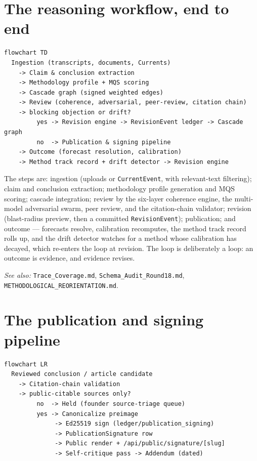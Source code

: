 \documentclass[11pt]{article}
\begin{document}
\section{The reasoning workflow, end to end}

\begin{Verbatim}[frame=single,fontsize=\small]
flowchart TD
  Ingestion (transcripts, documents, Currents)
    -> Claim & conclusion extraction
    -> Methodology profile + MQS scoring
    -> Cascade graph (signed weighted edges)
    -> Review (coherence, adversarial, peer-review, citation chain)
    -> blocking objection or drift?
         yes -> Revision engine -> RevisionEvent ledger -> Cascade graph
         no  -> Publication & signing pipeline
    -> Outcome (forecast resolution, calibration)
    -> Method track record + drift detector -> Revision engine
\end{Verbatim}

The steps are: ingestion (uploads or \texttt{CurrentEvent}, with relevant-text
filtering); claim and conclusion extraction; methodology profile generation
and MQS scoring; cascade integration; review by the six-layer coherence
engine, the multi-model adversarial swarm, peer review, and the citation-chain
validator; revision (blast-radius preview, then a committed
\texttt{RevisionEvent}); publication; and outcome --- forecasts resolve,
calibration recomputes, the method track record rolls up, and the drift
detector watches for a method whose calibration has decayed, which re-enters
the loop at revision. The loop is deliberately a loop: an outcome is evidence,
and evidence revises.

\textit{See also:} \texttt{Trace\_Coverage.md},
\texttt{Schema\_Audit\_Round18.md}, \texttt{METHODOLOGICAL\_REORIENTATION.md}.

\section{The publication and signing pipeline}

\begin{Verbatim}[frame=single,fontsize=\small]
flowchart LR
  Reviewed conclusion / article candidate
    -> Citation-chain validation
    -> public-citable sources only?
         no  -> Held (founder source-triage queue)
         yes -> Canonicalize preimage
              -> Ed25519 sign (ledger/publication_signing)
              -> PublicationSignature row
              -> Public render + /api/public/signature/[slug]
              -> Self-critique pass -> Addendum (dated)
\end{Verbatim}
\end{document}
